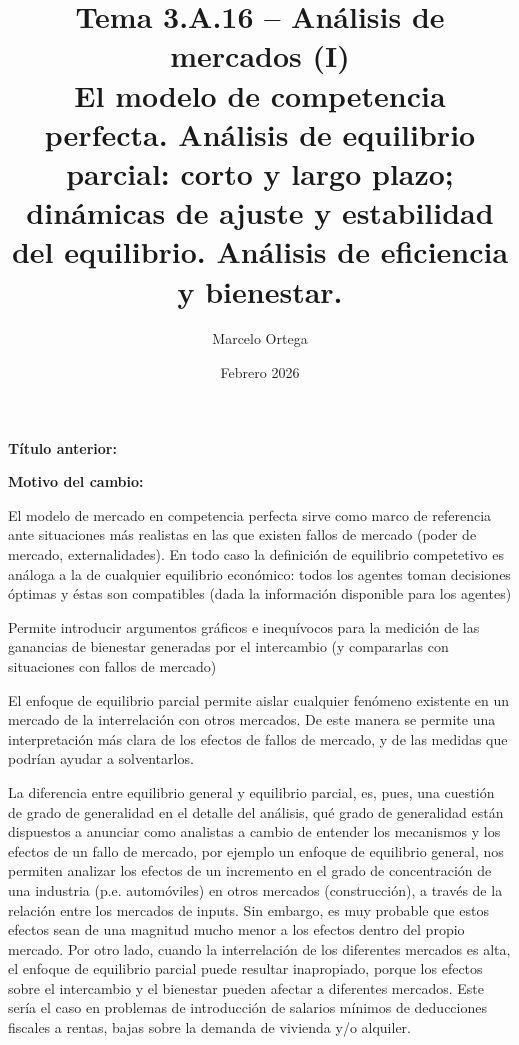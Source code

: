 \documentclass[10pt,a4paper]{article}
\title{Tema 3.A.16 -- Análisis de mercados (I)\\
\large El modelo de competencia perfecta. Análisis de equilibrio parcial: corto y largo plazo; dinámicas de ajuste y estabilidad del equilibrio. Análisis de eficiencia y bienestar.}
\author{Marcelo Ortega}
\date{Febrero 2026}
\newcommand{\puntosclave}[1]{%
  \begin{tcolorbox}[
    colframe=black,
    title={Puntos clave},
    before upper={\setlength{\parindent}{0.5cm}\setlength{\parskip}{0.5\baselineskip}}
  ]
  #1
  \end{tcolorbox}
}
\newcommand{\changebox}{%
\begin{tcolorbox}[title={Historial de cambios del tema}]
\textbf{Título anterior:} \OldTitle\par
\textbf{Motivo del cambio:} \ChangeWhy
\end{tcolorbox}
}
\begin{document}
\maketitle
\changebox

\newpage

\puntosclave{ %
    El modelo de mercado en competencia perfecta sirve como marco de referencia ante situaciones más realistas en las que existen fallos de mercado (poder de mercado, externalidades). En todo caso la definición de equilibrio competetivo es análoga a la de cualquier equilibrio económico: todos los agentes toman decisiones óptimas y éstas son compatibles (dada la información disponible para los agentes)

    Permite introducir argumentos gráficos e inequívocos para la medición de las ganancias de bienestar generadas por el intercambio (y compararlas con situaciones con fallos de mercado)
    
    El enfoque de equilibrio parcial permite aislar cualquier fenómeno existente en un mercado de la interrelación con otros mercados. De este manera se permite una interpretación más clara de los efectos de fallos de mercado, y de las medidas que podrían ayudar a solventarlos.
    
    La diferencia entre equilibrio general y equilibrio parcial, es, pues, una cuestión de grado de generalidad en el detalle del análisis, qué grado de generalidad están dispuestos a anunciar como analistas a cambio de entender los mecanismos y los efectos de un fallo de mercado, por ejemplo un enfoque de equilibrio general, nos permiten analizar los efectos de un incremento en el grado de concentración de una industria (p.e. automóviles) en otros mercados (construcción), a través de la relación entre los mercados de inputs. Sin embargo, es muy probable que estos efectos sean de una magnitud mucho menor a los efectos dentro del propio mercado. Por otro lado, cuando la interrelación de los diferentes mercados es alta, el enfoque de equilibrio parcial puede resultar inapropiado, porque los efectos sobre el intercambio y el bienestar pueden afectar a diferentes mercados. Este sería el caso en problemas de introducción de salarios mínimos de deducciones fiscales a rentas, bajas sobre la demanda de vivienda y/o alquiler.
    }
\vspace{1cm}
\end{document}
